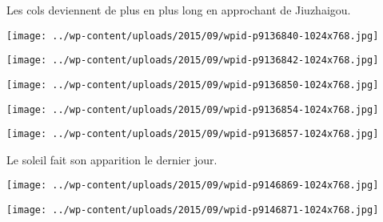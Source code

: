 \pagebreak
  Les cols deviennent de plus en plus long en approchant de Jiuzhaigou. 
\begin{center} \texttt{[image: ../wp-content/uploads/2015/09/wpid-p9136840-1024x768.jpg]} \end{center}
\begin{center} \texttt{[image: ../wp-content/uploads/2015/09/wpid-p9136842-1024x768.jpg]} \end{center}
\begin{center} \texttt{[image: ../wp-content/uploads/2015/09/wpid-p9136850-1024x768.jpg]} \end{center}
\begin{center} \texttt{[image: ../wp-content/uploads/2015/09/wpid-p9136854-1024x768.jpg]} \end{center}
\begin{center} \texttt{[image: ../wp-content/uploads/2015/09/wpid-p9136857-1024x768.jpg]} \end{center}

 Le soleil fait son apparition le dernier jour. 
\begin{center} \texttt{[image: ../wp-content/uploads/2015/09/wpid-p9146869-1024x768.jpg]} \end{center}
\begin{center} \texttt{[image: ../wp-content/uploads/2015/09/wpid-p9146871-1024x768.jpg]} \end{center}
